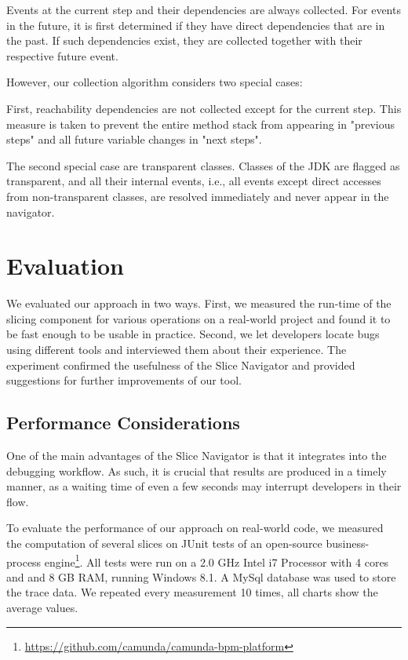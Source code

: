 \documentclass[
			english,
			review,
			]{elsarticle}
\begin{document}
Events at the current step and their dependencies are always collected.
For events in the future, it is first determined if they have direct dependencies that are in the past.
If such dependencies exist, they are collected together with their respective future event.

However, our collection algorithm considers two special cases:

First, reachability dependencies are not collected except for the current step.
This measure is taken to prevent the entire method stack from appearing in "previous steps" and all future variable changes in "next steps".

The second special case are transparent classes.
Classes of the JDK are flagged as transparent, and all their internal events, i.e., all events except direct accesses from non-transparent classes, are resolved immediately and never appear in the navigator.

\section{Evaluation}
\label{sec:eval}

We evaluated our approach in two ways.
First, we measured the run-time of the slicing component for various operations on a real-world project and found it to be fast enough to be usable in practice.
Second, we let developers locate bugs using different tools and interviewed them about their experience.
The experiment confirmed the usefulness of the Slice Navigator and provided suggestions for further improvements of our tool.

\subsection{Performance Considerations}

One of the main advantages of the Slice Navigator is that it integrates into the debugging workflow.
As such, it is crucial that results are produced in a timely manner, as a waiting time of even a few seconds may interrupt developers in their flow.

To evaluate the performance of our approach on real-world code, we measured the computation of several slices on JUnit tests of an open-source business-process engine\footnote{\url{https://github.com/camunda/camunda-bpm-platform}}.
All tests were run on a 2.0 GHz Intel i7 Processor with 4 cores and and 8 GB RAM, running Windows 8.1.
A MySql database was used to store the trace data.
We repeated every measurement 10 times, all charts show the average values.
\end{document}
